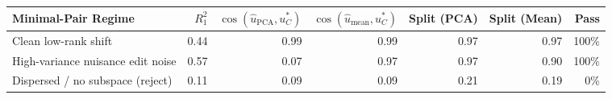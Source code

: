 \begin{tabular}{@{}l rrrrrr@{}}
\toprule
Minimal-Pair Regime & $R_1^2$ & $\cos(\hat{u}_{\mathrm{PCA}}, u_C^*)$ & $\cos(\hat{u}_{\mathrm{mean}}, u_C^*)$ & Split (PCA) & Split (Mean) & Pass \\
\midrule
Clean low-rank shift & 0.44 & 0.99 & 0.99 & 0.97 & 0.97 & 100\% \\
High-variance nuisance edit noise & 0.57 & 0.07 & 0.97 & 0.97 & 0.90 & 100\% \\
Dispersed / no subspace (reject) & 0.11 & 0.09 & 0.09 & 0.21 & 0.19 & 0\% \\
\bottomrule
\end{tabular}
